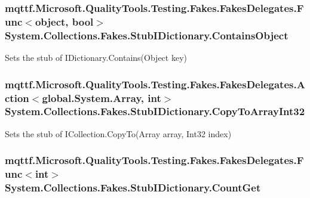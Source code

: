 \hypertarget{class_system_1_1_collections_1_1_fakes_1_1_stub_i_dictionary_a97ae730845cccb8b587c4a94dbf73c6f}{
\subsubsection[{Contains\-Object}]{\setlength{\rightskip}{0pt plus 5cm}mqttf.\-Microsoft.\-Quality\-Tools.\-Testing.\-Fakes.\-Fakes\-Delegates.\-Func$<$object, bool$>$ System.\-Collections.\-Fakes.\-Stub\-I\-Dictionary.\-Contains\-Object}}\label{class_system_1_1_collections_1_1_fakes_1_1_stub_i_dictionary_a97ae730845cccb8b587c4a94dbf73c6f}


Sets the stub of I\-Dictionary.\-Contains(\-Object key)

\hypertarget{class_system_1_1_collections_1_1_fakes_1_1_stub_i_dictionary_af6bf71bf75ed1c831a0d80ec9841273f}{
\subsubsection[{Copy\-To\-Array\-Int32}]{\setlength{\rightskip}{0pt plus 5cm}mqttf.\-Microsoft.\-Quality\-Tools.\-Testing.\-Fakes.\-Fakes\-Delegates.\-Action$<$global.\-System.\-Array, int$>$ System.\-Collections.\-Fakes.\-Stub\-I\-Dictionary.\-Copy\-To\-Array\-Int32}}\label{class_system_1_1_collections_1_1_fakes_1_1_stub_i_dictionary_af6bf71bf75ed1c831a0d80ec9841273f}


Sets the stub of I\-Collection.\-Copy\-To(\-Array array, Int32 index)

\hypertarget{class_system_1_1_collections_1_1_fakes_1_1_stub_i_dictionary_a7886623df1ec5a535229ba67ccc36a90}{
\subsubsection[{Count\-Get}]{\setlength{\rightskip}{0pt plus 5cm}mqttf.\-Microsoft.\-Quality\-Tools.\-Testing.\-Fakes.\-Fakes\-Delegates.\-Func$<$int$>$ System.\-Collections.\-Fakes.\-Stub\-I\-Dictionary.\-Count\-Get}}\label{class_system_1_1_collections_1_1_fakes_1_1_stub_i_dictionary_a7886623df1ec5a535229ba67ccc36a90}


